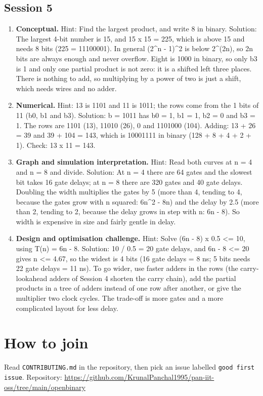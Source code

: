 \documentclass[11pt,a4paper]{article}
\begin{document}
\subsection*{Session 5}
\begin{enumerate}[nosep]
\item \textbf{Conceptual.} Hint: Find the largest product, and write 8 in binary. Solution: The largest 4-bit number is 15, and 15 x 15 = 225, which is above 15 and needs 8 bits (225 = 11100001). In general (2\textasciicircum{}n - 1)\textasciicircum{}2 is below 2\textasciicircum{}(2n), so 2n bits are always enough and never overflow. Eight is 1000 in binary, so only b3 is 1 and only one partial product is not zero: it is a shifted left three places. There is nothing to add, so multiplying by a power of two is just a shift, which needs wires and no adder.
\item \textbf{Numerical.} Hint: 13 is 1101 and 11 is 1011; the rows come from the 1 bits of 11 (b0, b1 and b3). Solution: b = 1011 has b0 = 1, b1 = 1, b2 = 0 and b3 = 1. The rows are 1101 (13), 11010 (26), 0 and 1101000 (104). Adding: 13 + 26 = 39 and 39 + 104 = 143, which is 10001111 in binary (128 + 8 + 4 + 2 + 1). Check: 13 x 11 = 143.
\item \textbf{Graph and simulation interpretation.} Hint: Read both curves at n = 4 and n = 8 and divide. Solution: At n = 4 there are 64 gates and the slowest bit takes 16 gate delays; at n = 8 there are 320 gates and 40 gate delays. Doubling the width multiplies the gates by 5 (more than 4, tending to 4, because the gates grow with n squared: 6n\textasciicircum{}2 - 8n) and the delay by 2.5 (more than 2, tending to 2, because the delay grows in step with n: 6n - 8). So width is expensive in size and fairly gentle in delay.
\item \textbf{Design and optimisation challenge.} Hint: Solve (6n - 8) x 0.5 \textless{}= 10, using T(n) = 6n - 8. Solution: 10 / 0.5 = 20 gate delays, and 6n - 8 \textless{}= 20 gives n \textless{}= 4.67, so the widest is 4 bits (16 gate delays = 8 ns; 5 bits needs 22 gate delays = 11 ns). To go wider, use faster adders in the rows (the carry-lookahead adders of Session 4 shorten the carry chain), add the partial products in a tree of adders instead of one row after another, or give the multiplier two clock cycles. The trade-off is more gates and a more complicated layout for less delay.
\end{enumerate}

\section{How to join}
Read \texttt{CONTRIBUTING.md} in the repository, then pick an issue labelled \texttt{good first issue}. Repository: \url{https://github.com/KrunalPanchal1995/pan-iit-oss/tree/main/openbinary}
\end{document}
